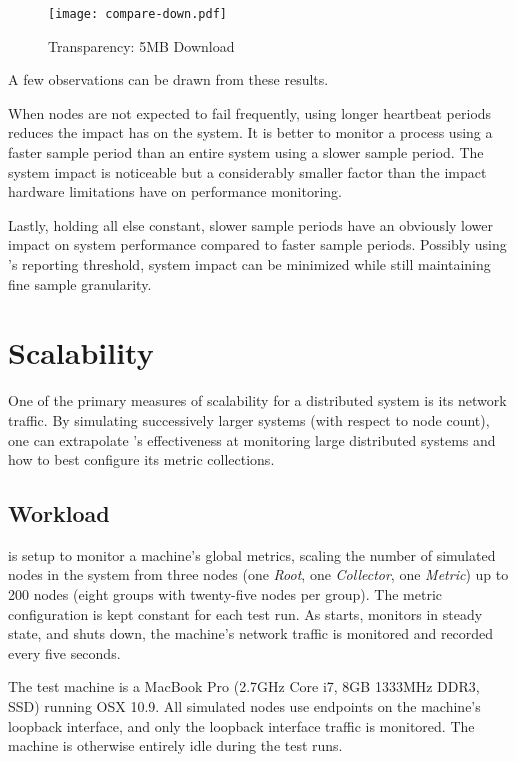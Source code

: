 \begin{figure}[H]
    \centering
    \vspace{-20pt}
    \texttt{[image: compare-down.pdf]}
    \vspace{-50pt}
    \caption{Transparency: 5MB Download}
    \label{fig:down5mb_graph}
\end{figure}

A few observations can be drawn from these results.

When nodes are not expected to fail frequently, using longer heartbeat periods reduces the impact \dcamp has on the
system. It is better to monitor a process using a faster sample period than an entire system using a slower sample
period. The \dcamp system impact is noticeable but a considerably smaller factor than the impact hardware limitations
have on performance monitoring.

Lastly, holding all else constant, slower sample periods have an obviously lower impact on system performance compared
to faster sample periods. Possibly using \dcampns's reporting threshold, system impact can be minimized while still
maintaining fine sample granularity.

\section{Scalability}

One of the primary measures of scalability for a distributed system is its network traffic.\cite{zanikolas2005} By
simulating successively larger \dcamp systems (with respect to node count), one can extrapolate \dcampns's effectiveness
at monitoring large distributed systems and how to best configure its metric collections.

\subsection{Workload}

\dcamp is setup to monitor a machine's global metrics, scaling the number of simulated nodes in the \dcamp system from
three nodes (one \textit{Root}, one \textit{Collector}, one \textit{Metric}) up to 200 nodes (eight groups with
twenty-five nodes per group). The metric configuration is kept constant for each test run. As \dcamp starts, monitors in
steady state, and shuts down, the machine's network traffic is monitored and recorded every five seconds.

The test machine is a MacBook Pro (2.7GHz Core i7, 8GB 1333MHz DDR3, SSD) running OSX 10.9. All simulated \dcamp nodes
use endpoints on the machine's loopback interface, and only the loopback interface traffic is monitored. The machine is
otherwise entirely idle during the test runs.

